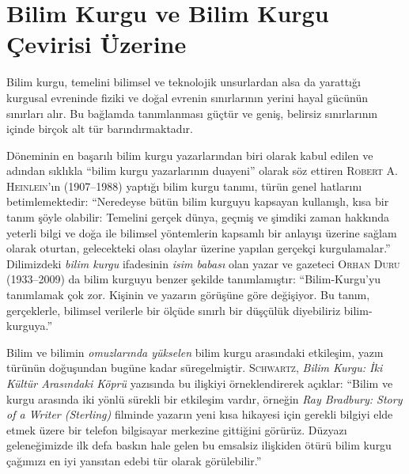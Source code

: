 
\chapter{Bilim Kurgu ve Bilim Kurgu Çevirisi Üzerine}

Bilim kurgu, temelini bilimsel ve teknolojik unsurlardan alsa da yarattığı
kurgusal evreninde fiziki ve doğal evrenin sınırlarının yerini hayal gücünün
sınırları alır. Bu bağlamda tanımlanması güçtür ve geniş, belirsiz sınırlarının
içinde birçok alt tür barındırmaktadır.

Döneminin en başarılı bilim kurgu yazarlarından biri olarak kabul edilen ve
adından sıklıkla ``bilim kurgu yazarlarının duayeni'' \citep{SFH09}
olarak söz ettiren \textsc{Robert A. Heinlein}'ın (1907--1988) yaptığı bilim
kurgu tanımı, türün genel hatlarını betimlemektedir: ``Neredeyse bütün bilim
kurguyu kapsayan kullanışlı, kısa bir tanım şöyle olabilir: Temelini gerçek
dünya, geçmiş ve şimdiki zaman hakkında yeterli bilgi ve doğa ile bilimsel
yöntemlerin kapsamlı bir anlayışı üzerine sağlam olarak oturtan, gelecekteki
olası olaylar üzerine yapılan gerçekçi kurgulamalar.'' \citep{SFN59}
Dilimizdeki \emph{bilim kurgu} ifadesinin \emph{isim
babası} olan yazar ve gazeteci \textsc{Orhan Duru} (1933--2009) da bilim kurguyu
benzer şekilde tanımlamıştır: ``Bilim-Kurgu'yu tanımlamak çok zor. Kişinin ve
yazarın görüşüne göre değişiyor.  Bu tanım, gerçeklerle, bilimsel verilerle bir
ölçüde sınırlı bir düşçülük diyebiliriz bilim-kurguya.'' \citep{XBil76}

Bilim ve bilimin \emph{omuzlarında yükselen} bilim kurgu arasındaki etkileşim,
yazın türünün doğuşundan bugüne kadar süregelmiştir. \textsc{Schwartz}, \emph{Bilim
Kurgu: İki Kültür Arasındaki Köprü} yazısında bu ilişkiyi örneklendirerek
açıklar: ``Bilim ve kurgu arasında iki yönlü sürekli bir etkileşim vardır,
örneğin \emph{Ray Bradbury: Story of a Writer (Sterling)} filminde yazarın yeni
kısa hikayesi için gerekli bilgiyi elde etmek üzere bir telefon bilgisayar
merkezine gittiğini görürüz. Düzyazı geleneğimizde ilk defa baskın hale gelen bu
emsalsiz ilişkiden ötürü bilim kurgu çağımızı en iyi yansıtan edebi tür olarak
görülebilir.'' \citep{schwartz71}

